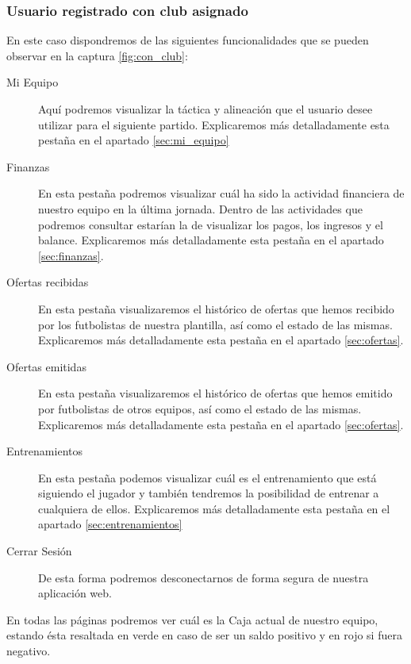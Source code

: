 \subsubsection{Usuario registrado con club asignado}
En este caso dispondremos de las siguientes funcionalidades que se pueden
observar en la captura \ref{fig:con_club}:


\begin{description}
\item [Mi Equipo] Aquí podremos visualizar la táctica y alineación que el
  usuario desee utilizar para el siguiente partido. Explicaremos más
  detalladamente esta pestaña en el apartado \ref{sec:mi_equipo}
\item [Finanzas] En esta pestaña podremos visualizar cuál ha sido la actividad
  financiera de nuestro equipo en la última jornada. Dentro de las actividades
  que podremos consultar estarían la de visualizar los pagos, los ingresos y el
  balance. Explicaremos más detalladamente esta pestaña en el apartado
  \ref{sec:finanzas}.
\item [Ofertas recibidas] En esta pestaña visualizaremos el histórico de ofertas
  que hemos recibido por los futbolistas de nuestra plantilla, así como el
  estado de las mismas. Explicaremos más detalladamente esta pestaña en el
  apartado \ref{sec:ofertas}.
\item [Ofertas emitidas] En esta pestaña visualizaremos el histórico de ofertas
  que hemos emitido por futbolistas de otros equipos, así como el estado de las
  mismas. Explicaremos más detalladamente esta pestaña en el apartado
  \ref{sec:ofertas}.
\item [Entrenamientos] En esta pestaña podemos visualizar cuál es el
  entrenamiento que está siguiendo el jugador y también tendremos la posibilidad
  de entrenar a cualquiera de ellos. Explicaremos más detalladamente esta
  pestaña en el apartado \ref{sec:entrenamientos}
\item [Cerrar Sesión] De esta forma podremos desconectarnos de forma segura de
  nuestra aplicación web.
\end{description}

En todas las páginas podremos ver cuál es la Caja actual de nuestro equipo,
estando ésta resaltada en verde en caso de ser un saldo positivo y en rojo si
fuera negativo.

